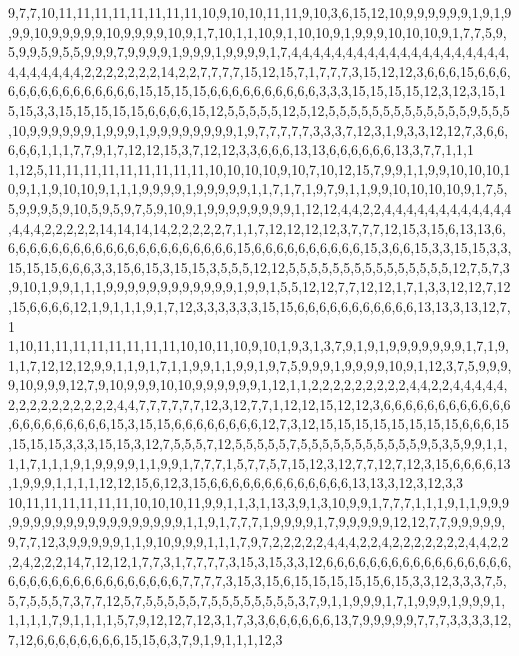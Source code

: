 9,7,7,10,11,11,11,11,11,11,11,11,10,9,10,10,11,11,9,10,3,6,15,12,10,9,9,9,9,9,9,1,9,1,9,9,9,10,9,9,9,9,9,10,9,9,9,9,10,9,1,7,10,1,1,10,9,1,10,10,9,1,9,9,9,10,10,10,9,1,7,7,5,9,5,9,9,5,9,5,5,9,9,9,7,9,9,9,9,1,9,9,9,1,9,9,9,9,1,7,4,4,4,4,4,4,4,4,4,4,4,4,4,4,4,4,4,4,4,4,4,4,4,4,4,4,4,2,2,2,2,2,2,2,14,2,2,7,7,7,7,15,12,15,7,1,7,7,7,3,15,12,12,3,6,6,6,15,6,6,6,6,6,6,6,6,6,6,6,6,6,6,6,15,15,15,15,6,6,6,6,6,6,6,6,6,6,3,3,3,15,15,15,15,12,3,12,3,15,15,15,3,3,15,15,15,15,15,6,6,6,6,15,12,5,5,5,5,5,12,5,12,5,5,5,5,5,5,5,5,5,5,5,5,5,9,5,5,5,10,9,9,9,9,9,9,1,9,9,9,1,9,9,9,9,9,9,9,9,1,9,7,7,7,7,7,3,3,3,7,12,3,1,9,3,3,12,12,7,3,6,6,6,6,6,1,1,1,7,7,9,1,7,12,12,15,3,7,12,12,3,3,6,6,6,13,13,6,6,6,6,6,6,13,3,7,7,1,1,1
1,12,5,11,11,11,11,11,11,11,11,11,10,10,10,10,9,10,7,10,12,15,7,9,9,1,1,9,9,10,10,10,10,9,1,1,9,10,10,9,1,1,1,9,9,9,9,1,9,9,9,9,9,1,1,7,1,7,1,9,7,9,1,1,9,9,10,10,10,10,9,1,7,5,5,9,9,9,5,9,10,5,9,5,9,7,5,9,10,9,1,9,9,9,9,9,9,9,9,1,12,12,4,4,2,2,4,4,4,4,4,4,4,4,4,4,4,4,4,4,4,2,2,2,2,2,14,14,14,14,2,2,2,2,2,7,1,1,7,12,12,12,12,3,7,7,7,12,15,3,15,6,13,13,6,6,6,6,6,6,6,6,6,6,6,6,6,6,6,6,6,6,6,6,6,6,15,6,6,6,6,6,6,6,6,6,6,15,3,6,6,15,3,3,15,15,3,3,15,15,15,6,6,6,3,3,15,6,15,3,15,15,3,5,5,5,12,12,5,5,5,5,5,5,5,5,5,5,5,5,5,5,5,12,7,5,7,3,9,10,1,9,9,1,1,1,9,9,9,9,9,9,9,9,9,9,9,9,1,9,9,1,5,5,12,12,7,7,12,12,1,7,1,3,3,12,12,7,12,15,6,6,6,6,12,1,9,1,1,1,9,1,7,12,3,3,3,3,3,3,15,15,6,6,6,6,6,6,6,6,6,6,6,13,13,3,13,12,7,1
1,10,11,11,11,11,11,11,11,11,10,10,11,10,9,10,1,9,3,1,3,7,9,1,9,1,9,9,9,9,9,9,9,1,7,1,9,1,1,7,12,12,12,9,9,1,1,9,1,7,1,1,9,9,1,1,9,9,1,9,7,5,9,9,9,1,9,9,9,9,10,9,1,12,3,7,5,9,9,9,9,10,9,9,9,12,7,9,10,9,9,9,10,10,9,9,9,9,9,9,1,12,1,1,2,2,2,2,2,2,2,2,2,4,4,2,2,4,4,4,4,4,2,2,2,2,2,2,2,2,2,2,4,4,7,7,7,7,7,7,12,3,12,7,7,1,12,12,15,12,12,3,6,6,6,6,6,6,6,6,6,6,6,6,6,6,6,6,6,6,6,6,6,15,3,15,15,6,6,6,6,6,6,6,6,12,7,3,12,15,15,15,15,15,15,15,15,6,6,6,15,15,15,15,3,3,3,15,15,3,12,7,5,5,5,7,12,5,5,5,5,5,7,5,5,5,5,5,5,5,5,5,5,5,9,5,3,5,9,9,1,1,1,1,7,1,1,1,9,1,9,9,9,9,1,1,9,9,1,7,7,7,1,5,7,7,5,7,15,12,3,12,7,7,12,7,12,3,15,6,6,6,6,13,1,9,9,9,1,1,1,1,12,12,15,6,12,3,15,6,6,6,6,6,6,6,6,6,6,6,6,6,13,13,3,12,3,12,3,3
10,11,11,11,11,11,11,10,10,10,11,9,9,1,1,3,1,13,3,9,1,3,10,9,9,1,7,7,7,1,1,1,9,1,1,9,9,9,9,9,9,9,9,9,9,9,9,9,9,9,9,9,9,9,1,1,9,1,7,7,7,1,9,9,9,9,1,7,9,9,9,9,9,12,12,7,7,9,9,9,9,9,9,7,7,12,3,9,9,9,9,9,1,1,9,10,9,9,9,1,1,1,7,9,7,2,2,2,2,2,4,4,4,2,2,4,2,2,2,2,2,2,2,4,4,2,2,2,4,2,2,2,14,7,12,12,1,7,7,3,1,7,7,7,7,3,15,3,15,3,3,12,6,6,6,6,6,6,6,6,6,6,6,6,6,6,6,6,6,6,6,6,6,6,6,6,6,6,6,6,6,6,6,6,6,7,7,7,7,3,15,3,15,6,15,15,15,15,15,6,15,3,3,12,3,3,3,7,5,5,7,5,5,5,7,3,7,7,12,5,7,5,5,5,5,5,7,5,5,5,5,5,5,5,5,3,7,9,1,1,9,9,9,1,7,1,9,9,9,1,9,9,9,1,1,1,1,1,7,9,1,1,1,1,5,7,9,12,12,7,12,3,1,7,3,3,6,6,6,6,6,6,13,7,9,9,9,9,9,7,7,7,3,3,3,3,12,7,12,6,6,6,6,6,6,6,6,15,15,6,3,7,9,1,9,1,1,1,12,3
